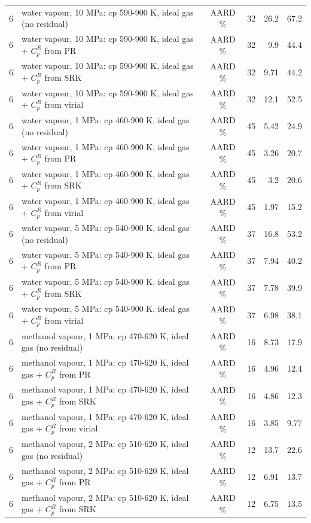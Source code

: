 \begin{tabular}{c p{8.6cm} c r r r}
6 & water vapour, 10 MPa: cp 590-900 K, ideal gas (no residual) & AARD \% & 32 & 26.2 & 67.2 \\
6 & water vapour, 10 MPa: cp 590-900 K, ideal gas + $C_p^R$ from PR & AARD \% & 32 & 9.9 & 44.4 \\
6 & water vapour, 10 MPa: cp 590-900 K, ideal gas + $C_p^R$ from SRK & AARD \% & 32 & 9.71 & 44.2 \\
6 & water vapour, 10 MPa: cp 590-900 K, ideal gas + $C_p^R$ from virial & AARD \% & 32 & 12.1 & 52.5 \\
6 & water vapour, 1 MPa: cp 460-900 K, ideal gas (no residual) & AARD \% & 45 & 5.42 & 24.9 \\
6 & water vapour, 1 MPa: cp 460-900 K, ideal gas + $C_p^R$ from PR & AARD \% & 45 & 3.26 & 20.7 \\
6 & water vapour, 1 MPa: cp 460-900 K, ideal gas + $C_p^R$ from SRK & AARD \% & 45 & 3.2 & 20.6 \\
6 & water vapour, 1 MPa: cp 460-900 K, ideal gas + $C_p^R$ from virial & AARD \% & 45 & 1.97 & 15.2 \\
6 & water vapour, 5 MPa: cp 540-900 K, ideal gas (no residual) & AARD \% & 37 & 16.8 & 53.2 \\
6 & water vapour, 5 MPa: cp 540-900 K, ideal gas + $C_p^R$ from PR & AARD \% & 37 & 7.94 & 40.2 \\
6 & water vapour, 5 MPa: cp 540-900 K, ideal gas + $C_p^R$ from SRK & AARD \% & 37 & 7.78 & 39.9 \\
6 & water vapour, 5 MPa: cp 540-900 K, ideal gas + $C_p^R$ from virial & AARD \% & 37 & 6.98 & 38.1 \\
6 & methanol vapour, 1 MPa: cp 470-620 K, ideal gas (no residual) & AARD \% & 16 & 8.73 & 17.9 \\
6 & methanol vapour, 1 MPa: cp 470-620 K, ideal gas + $C_p^R$ from PR & AARD \% & 16 & 4.96 & 12.4 \\
6 & methanol vapour, 1 MPa: cp 470-620 K, ideal gas + $C_p^R$ from SRK & AARD \% & 16 & 4.86 & 12.3 \\
6 & methanol vapour, 1 MPa: cp 470-620 K, ideal gas + $C_p^R$ from virial & AARD \% & 16 & 3.85 & 9.77 \\
6 & methanol vapour, 2 MPa: cp 510-620 K, ideal gas (no residual) & AARD \% & 12 & 13.7 & 22.6 \\
6 & methanol vapour, 2 MPa: cp 510-620 K, ideal gas + $C_p^R$ from PR & AARD \% & 12 & 6.91 & 13.7 \\
6 & methanol vapour, 2 MPa: cp 510-620 K, ideal gas + $C_p^R$ from SRK & AARD \% & 12 & 6.75 & 13.5 \\

\end{tabular}
